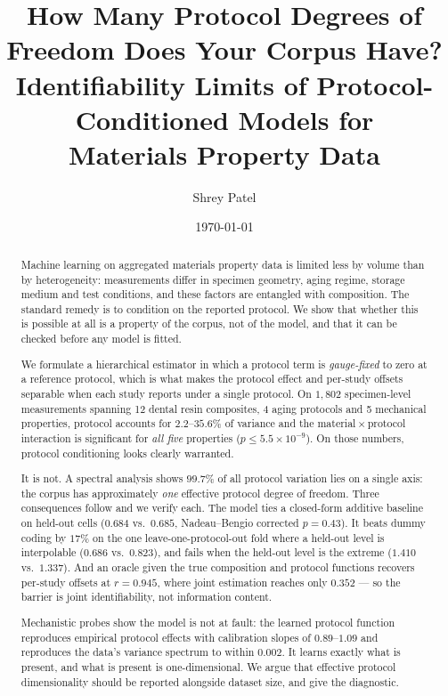 \documentclass[11pt]{article}
\title{\bf How Many Protocol Degrees of Freedom Does Your Corpus Have?\\
\large Identifiability Limits of Protocol-Conditioned Models for\\
Materials Property Data}
\author{Shrey Patel}
\date{\today}
\begin{document}
\maketitle

\begin{abstract}
Machine learning on aggregated materials property data is limited less by
volume than by heterogeneity: measurements differ in specimen geometry, aging
regime, storage medium and test conditions, and these factors are entangled
with composition. The standard remedy is to condition on the reported protocol.
We show that whether this is possible at all is a property of the corpus, not
of the model, and that it can be checked before any model is fitted.

We formulate a hierarchical estimator in which a protocol term is
\emph{gauge-fixed} to zero at a reference protocol, which is what makes the
protocol effect and per-study offsets separable when each study reports under a
single protocol. On $1{,}802$ specimen-level measurements spanning 12 dental
resin composites, 4 aging protocols and 5 mechanical properties, protocol
accounts for $2.2$--$35.6\%$ of variance and the material\,$\times$\,protocol
interaction is significant for \emph{all five} properties
($p \le 5.5\times10^{-9}$). On those numbers, protocol conditioning looks
clearly warranted.

It is not. A spectral analysis shows $99.7\%$ of all protocol variation lies on
a single axis: the corpus has approximately \emph{one} effective protocol
degree of freedom. Three consequences follow and we verify each. The model ties
a closed-form additive baseline on held-out cells
($0.684$ vs.\ $0.685$, Nadeau--Bengio corrected $p = 0.43$). It beats dummy
coding by $17\%$ on the one leave-one-protocol-out fold where a held-out level
is interpolable ($0.686$ vs.\ $0.823$), and fails when the held-out level is
the extreme ($1.410$ vs.\ $1.337$). And an oracle given the true composition
and protocol functions recovers per-study offsets at $r = 0.945$, where joint
estimation reaches only $0.352$ --- so the barrier is joint identifiability,
not information content.

Mechanistic probes show the model is not at fault: the learned protocol
function reproduces empirical protocol effects with calibration slopes of
$0.89$--$1.09$ and reproduces the data's variance spectrum to within
$0.002$. It learns exactly what is present, and what is present is
one-dimensional. We argue that effective protocol dimensionality should be
reported alongside dataset size, and give the diagnostic.
\end{abstract}
\end{document}
